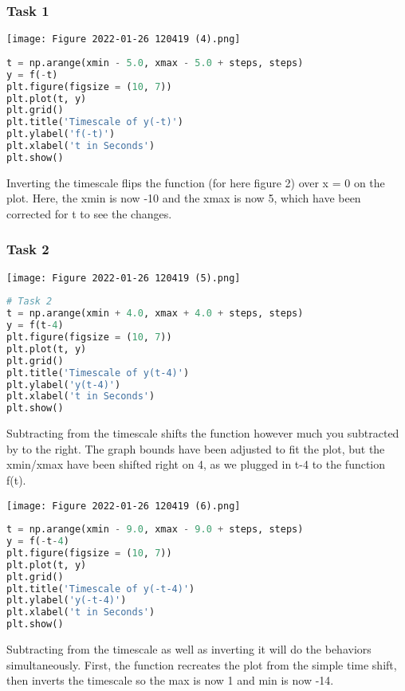 \documentclass[11pt,a4]{article}
\begin{document}
\subsubsection{Task 1}

\texttt{[image: Figure 2022-01-26 120419 (4).png]}

\begin{lstlisting}[language=Python]
t = np.arange(xmin - 5.0, xmax - 5.0 + steps, steps)
y = f(-t)
plt.figure(figsize = (10, 7))
plt.plot(t, y)
plt.grid()
plt.title('Timescale of y(-t)')
plt.ylabel('f(-t)')
plt.xlabel('t in Seconds')
plt.show()
\end{lstlisting}

Inverting the timescale flips the function (for here figure 2) over x = 0 on the plot. Here, the xmin is now -10 and the xmax is now 5, which have been corrected for t to see the changes.

\subsubsection{Task 2}

\texttt{[image: Figure 2022-01-26 120419 (5).png]}

\begin{lstlisting}[language=Python]
# Task 2
t = np.arange(xmin + 4.0, xmax + 4.0 + steps, steps)
y = f(t-4)
plt.figure(figsize = (10, 7))
plt.plot(t, y)
plt.grid()
plt.title('Timescale of y(t-4)')
plt.ylabel('y(t-4)')
plt.xlabel('t in Seconds')
plt.show()
\end{lstlisting}

Subtracting from the timescale shifts the function however much you subtracted by to the right. The graph bounds have been adjusted to fit the plot, but the xmin/xmax have been shifted right on 4, as we plugged in t-4 to the function f(t).

\texttt{[image: Figure 2022-01-26 120419 (6).png]}

\begin{lstlisting}[language=Python]
t = np.arange(xmin - 9.0, xmax - 9.0 + steps, steps)
y = f(-t-4)
plt.figure(figsize = (10, 7))
plt.plot(t, y)
plt.grid()
plt.title('Timescale of y(-t-4)')
plt.ylabel('y(-t-4)')
plt.xlabel('t in Seconds')
plt.show()
\end{lstlisting}

Subtracting from the timescale as well as inverting it will do the behaviors simultaneously. First, the function recreates the plot from the simple time shift, then inverts the timescale so the max is now 1 and min is now -14.
\end{document}
